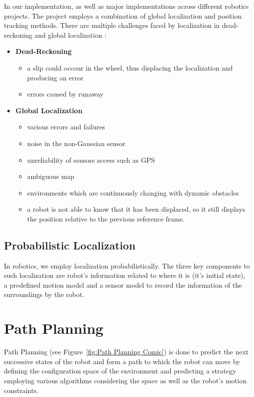 In our implementation, as well as major implementations across different robotics projects. The project employs a combination of global localization and position tracking methods.
There are multiple challenges faced by localization in dead-reckoning and global localization : 
\begin{itemize}
    \item \textbf{Dead-Reckoning} \begin{itemize} \item a slip could occour in the wheel, thus displacing the localization and producing an error \item errors caused by runaway \end{itemize}
    \item \textbf{Global Localization} \begin{itemize} \item various errors and failures \item noise in the non-Gaussian sensor \item unreliability of sensors access such as GPS \item ambiguous map \item environments which are continuously changing with dynamic obstacles \item a robot is not able to know that it has been displaced, so it still displays the position relative to the previous reference frame.  \end{itemize}
\end{itemize}
\subsection{Probabilistic Localization}
In robotics, we employ localization probabilistically. The three key components to such localization are robot's information related to where it is (it's initial state), a predefined motion model and a sensor model to record the information of the surroundings by the robot.


\section{Path Planning}
Path Planning (see Figure~\ref{fig:Path Planning Comic}) is done to predict the next successive states of the robot and form a path to which the robot can move by defining the configuration space of the environment and predicting a strategy employing various algorithms considering the space as well as the robot's motion constraints.

